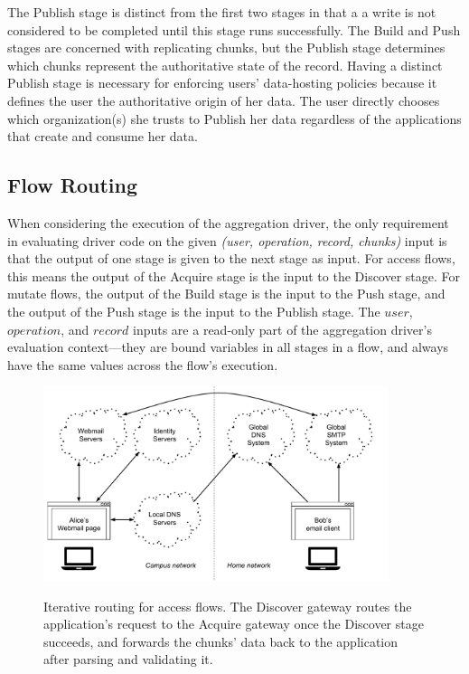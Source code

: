 The Publish stage is distinct from the first two stages in that a
a write is not considered to be completed until this stage runs successfully.
The Build and Push stages are concerned with replicating chunks, but the Publish stage determines
which chunks represent the authoritative state of the record.
Having a distinct Publish stage is necessary for enforcing users' data-hosting
policies because it defines the user the authoritative origin of her data.  The
user directly chooses which organization(s) she trusts to Publish her data
regardless of the applications that create and consume her data.

\subsection{Flow Routing}

When considering the execution of the aggregation driver, the only requirement in evaluating
driver code on the given \textit{(user, operation, record, chunks)} input is
that the output of one stage is given to the next stage as input.  For access
flows, this means the output of the Acquire stage is the input to the Discover
stage.  For mutate flows, the output of the Build stage is the input to the Push
stage, and the output of the Push stage is the input to the Publish stage.  The
$user$, $operation$, and $record$ inputs are a read-only part of the aggregation driver's
evaluation context---they are bound variables in all stages in a flow, and
always have the same values across the flow's execution.

\begin{figure}[h!]
   \caption{Iterative routing for access flows.  The Discover gateway routes the
   application's request to the Acquire gateway once the Discover stage
   succeeds, and forwards the chunks' data back to the application after parsing
   and validating it.}
   \centering
   \includegraphics[width=0.9\textwidth,page=9]{figures/dissertation-figures}
   \label{fig:chap2-access-flow-protocol}
\end{figure}

